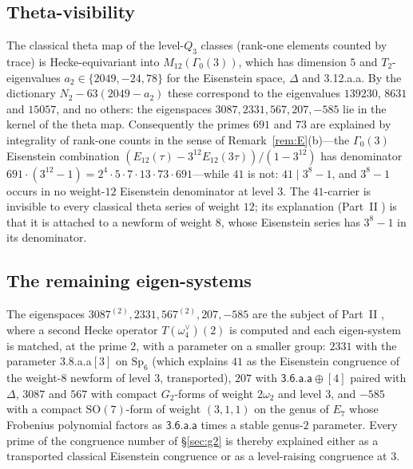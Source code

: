 \documentclass[11pt]{amsart}
\theoremstyle{definition}
\begin{document}
\subsection{Theta-visibility} The classical theta map of the level-$Q_3$ classes (rank-one elements counted by trace) is Hecke-equivariant into $M_{12}(\Gamma_0(3))$, which has dimension $5$ and $T_2$-eigenvalues $a_2\in\{2049,-24,78\}$ for the Eisenstein space, $\Delta$ and \textsf{3.12.a.a}. By the dictionary $N_2-63(2049-a_2)$ these correspond to the eigenvalues $139230$, $8631$ and $15057$, and no others: the eigenspaces $3087,2331,567,207,-585$ lie in the kernel of the theta map. Consequently the primes $691$ and $73$ are explained by integrality of rank-one counts in the sense of Remark~\ref{rem:E}(b)---the $\Gamma_0(3)$ Eisenstein combination $(E_{12}(\tau)-3^{12}E_{12}(3\tau))/(1-3^{12})$ has denominator $691\cdot(3^{12}-1)=2^4\cdot5\cdot7\cdot13\cdot73\cdot691$---while $41$ is not: $41\mid3^8-1$, and $3^8-1$ occurs in no weight-$12$ Eisenstein denominator at level $3$. The $41$-carrier is invisible to every classical theta series of weight $12$; its explanation (Part~II \cite{PartII}) is that it is attached to a newform of weight $8$, whose Eisenstein series has $3^8-1$ in its denominator.

\subsection{The remaining eigen-systems} The eigenspaces $3087^{(2)},2331,567^{(2)},207,-585$ are the subject of Part~II \cite{PartII}, where a second Hecke operator $T(\omega_4^\vee)(2)$ is computed and each eigen-system is matched, at the prime $2$, with a parameter on a smaller group: $2331$ with the parameter \textsf{3.8.a.a}$[3]$ on $\mathrm{Sp}_6$ (which explains $41$ as the Eisenstein congruence of the weight-$8$ newform of level $3$, transported), $207$ with $\textsf{3.6.a.a}\oplus[4]$ paired with $\Delta$, $3087$ and $567$ with compact $G_2$-forms of weight $2\omega_2$ and level $3$, and $-585$ with a compact $\mathrm{SO}(7)$-form of weight $(3,1,1)$ on the genus of $E_7$ whose Frobenius polynomial factors as $\textsf{3.6.a.a}$ times a stable genus-$2$ parameter. Every prime of the congruence number of \S\ref{sec:g2} is thereby explained either as a transported classical Eisenstein congruence or as a level-raising congruence at $3$.
\end{document}
